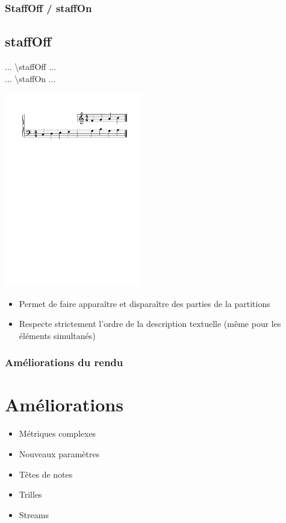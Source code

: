 \documentclass[12pt]{beamer}
\newenvironment{code}
  {\fontfamily{prc}\selectfont}{}
\begin{document}
    \begin{frame}
    \frametitle{StaffOff / staffOn}
    \subsection{staffOff}
    
    \begin{code} ... \textbackslash{}staffOff ... \hspace{1cm} \end{code} \\
    \begin{code} ... \textbackslash{}staffOn ... \end{code}
    
    \begin{center} \includegraphics[width=6cm]{img/staffoff.pdf} \end{center}
    
    \begin{itemize}
      \item Permet de faire apparaître et disparaître des parties de la partitions
      \item Respecte strictement l'ordre de la description textuelle (même pour les éléments simultanés)
    \end{itemize}
    
    \end{frame}

    \begin{frame}
    \frametitle{Améliorations du rendu}
    \section{Améliorations}
    
    \large
    
    \begin{itemize}
      \item Métriques complexes
      \item Nouveaux paramètres
      \item Têtes de notes
      \item Trilles
      \item Streams
    \end{itemize}
    
    \end{frame}
\end{document}
